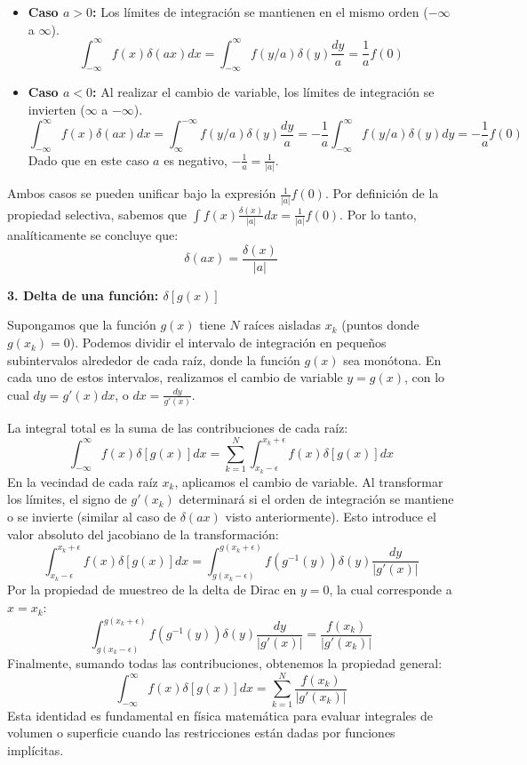 \documentclass[a4paper]{article}
\begin{document}
\begin{itemize}
    \item \textbf{Caso $a > 0$:} Los límites de integración se mantienen en el mismo orden ($-\infty$ a $\infty$).
    $$ \int_{-\infty}^{\infty} f(x) \delta(ax) dx = \int_{-\infty}^{\infty} f(y/a) \delta(y) \frac{dy}{a} = \frac{1}{a} f(0) $$
    \item \textbf{Caso $a < 0$:} Al realizar el cambio de variable, los límites de integración se invierten ($\infty$ a $-\infty$).
    $$ \int_{-\infty}^{\infty} f(x) \delta(ax) dx = \int_{\infty}^{-\infty} f(y/a) \delta(y) \frac{dy}{a} = -\frac{1}{a} \int_{-\infty}^{\infty} f(y/a) \delta(y) dy = -\frac{1}{a} f(0) $$
    Dado que en este caso $a$ es negativo, $-\frac{1}{a} = \frac{1}{|a|}$.
\end{itemize}

Ambos casos se pueden unificar bajo la expresión $\frac{1}{|a|} f(0)$. Por definición de la propiedad selectiva, sabemos que $\int f(x) \frac{\delta(x)}{|a|} dx = \frac{1}{|a|} f(0)$. Por lo tanto, analíticamente se concluye que:
$$ \delta(ax) = \frac{\delta(x)}{|a|} $$

\textbf{3. Delta de una función: $\delta[g(x)]$}

Supongamos que la función $g(x)$ tiene $N$ raíces aisladas $x_k$ (puntos donde $g(x_k) = 0$). Podemos dividir el intervalo de integración en pequeños subintervalos alrededor de cada raíz, donde la función $g(x)$ sea monótona. En cada uno de estos intervalos, realizamos el cambio de variable $y = g(x)$, con lo cual $dy = g'(x) dx$, o $dx = \frac{dy}{g'(x)}$.

La integral total es la suma de las contribuciones de cada raíz:
$$ \int_{-\infty}^{\infty} f(x) \delta[g(x)] dx = \sum_{k=1}^N \int_{x_k-\epsilon}^{x_k+\epsilon} f(x) \delta[g(x)] dx $$
En la vecindad de cada raíz $x_k$, aplicamos el cambio de variable. Al transformar los límites, el signo de $g'(x_k)$ determinará si el orden de integración se mantiene o se invierte (similar al caso de $\delta(ax)$ visto anteriormente). Esto introduce el valor absoluto del jacobiano de la transformación:
$$ \int_{x_k-\epsilon}^{x_k+\epsilon} f(x) \delta[g(x)] dx = \int_{g(x_k-\epsilon)}^{g(x_k+\epsilon)} f(g^{-1}(y)) \delta(y) \frac{dy}{|g'(x)|} $$
Por la propiedad de muestreo de la delta de Dirac en $y=0$, la cual corresponde a $x=x_k$:
$$ \int_{g(x_k-\epsilon)}^{g(x_k+\epsilon)} f(g^{-1}(y)) \delta(y) \frac{dy}{|g'(x)|} = \frac{f(x_k)}{|g'(x_k)|} $$
Finalmente, sumando todas las contribuciones, obtenemos la propiedad general:
$$ \int_{-\infty}^{\infty} f(x) \delta[g(x)] dx = \sum_{k=1}^N \frac{f(x_k)}{|g'(x_k)|} $$
Esta identidad es fundamental en física matemática para evaluar integrales de volumen o superficie cuando las restricciones están dadas por funciones implícitas.
\end{document}
